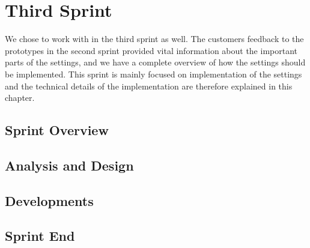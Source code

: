 \chapter{Third Sprint}\label{chap:sprint3}
We chose to work with \launcher in the third sprint as well.
The customers feedback to the prototypes in the second sprint provided vital information about the important parts of the settings, and we have a complete overview of how the settings should be implemented.
This sprint is mainly focused on implementation of the settings and the technical details of the implementation are therefore explained in this chapter.

\section{Sprint Overview}


\section{Analysis and Design}


\section{Developments}


\section{Sprint End}
